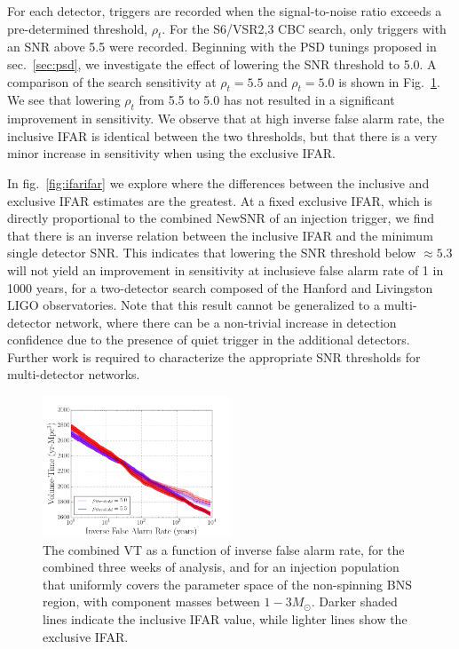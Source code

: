For each detector, triggers are recorded when the signal-to-noise ratio exceeds a pre-determined threshold, $\rho_t$. For the S6/VSR2,3 CBC search, only triggers with an SNR above 5.5 were recorded. Beginning with the PSD tunings proposed in sec.~\ref{sec:psd}, we investigate the effect of lowering the SNR threshold to 5.0. A comparison of the search sensitivity at $\rho_t=5.5$ and $\rho_t=5.0$ is shown in Fig.~\ref{fig:snrthreshold}. We see that lowering $\rho_t$ from 5.5 to 5.0 has not resulted in a significant improvement in sensitivity. We observe that at high inverse false alarm rate, the inclusive IFAR is identical between the two thresholds, but that there is a very minor increase in sensitivity when using the exclusive IFAR.

In fig.~\ref{fig:ifarifar} we explore where the differences between the inclusive and exclusive IFAR estimates are the greatest. At a fixed exclusive IFAR, which is directly proportional to the combined NewSNR of an injection trigger, we find that there is an inverse relation between the inclusive IFAR and the minimum single detector SNR. This indicates that lowering the SNR threshold below $\approx 5.3$ will not yield an improvement in sensitivity at inclusieve false alarm rate of 1 in 1000 years, for a two-detector search composed of the Hanford and Livingston LIGO observatories. Note that this result cannot be generalized to a multi-detector network, where there can be a non-trivial increase in detection confidence due to the presence of quiet trigger in the additional detectors. Further work is required to characterize the appropriate SNR thresholds for multi-detector networks.



\begin{figure}
\centering
\includegraphics[width=0.5\textwidth]{papers/bns_o1_dev/figures/snr_combined.png}
\caption{\label{fig:snrthreshold} 
The combined VT as a function of inverse false alarm rate, for the combined three weeks of analysis, and for an injection population that uniformly covers the parameter space of the non-spinning BNS region, with component masses between $1- 3M_\odot$. Darker shaded lines indicate the inclusive IFAR value, while lighter lines show the exclusive IFAR. 
}
\end{figure}

